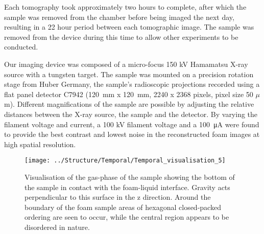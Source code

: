 \documentclass[10pt,a4paper]{article}
\begin{document}

Each tomography took approximately two hours to complete, after which the sample was removed from the chamber before being imaged the next day, resulting in a 22 hour period between each tomographic image. The sample was removed from the device during this time to allow other experiments to be conducted. 


Our imaging device was composed of a micro-focus 150 kV Hamamatsu X-ray source with a tungsten target. The sample was mounted on a precision rotation stage from Huber Germany, the sample's radioscopic projections recorded using a flat panel detector C7942 (\SI{120}{\mm} x \SI{120}{\mm}, 2240 x 2368 pixels, pixel size 50 $\mu$m). Different magnifications of the sample are possible by adjusting the relative distances between the X-ray source, the sample and the detector.
By varying the filament voltage and current, a 100 kV filament voltage and a \SI{100}{\uA} were found to provide the best contrast and lowest noise in the reconstructed foam images at high spatial resolution.

\begin{figure}[ht!]
\centering
\texttt{[image: ../Structure/Temporal/Temporal\_visualisation\_5]}
\caption{Visualisation of the gas-phase of the sample showing the bottom of the sample in contact with the foam-liquid interface. Gravity acts perpendicular to this surface in the z direction. Around the boundary of the foam sample areas of hexagonal closed-packed ordering are seen to occur, while the central region appears to be disordered in nature.}
\label{fig:Sample_visualisation}
\end{figure}
\end{document}
